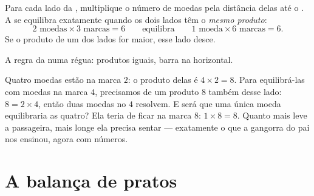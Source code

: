 \begin{proposition}\label{prop:g3:levers-and-scales:rule}
Para cada lado da , multiplique o número de moedas pela
distância delas até o . A  se equilibra
exatamente quando os dois lados têm o \emph{mesmo produto}:
\[
2 \text{ moedas} \times 3 \text{ marcas} = 6
\qquad\text{equilibra}\qquad
1 \text{ moeda} \times 6 \text{ marcas} = 6 .
\]
Se o produto de um dos lados for maior, esse lado desce.
\end{proposition}

\begin{omfigure}

{\small A regra da  numa régua: produtos iguais, barra na
horizontal.}
\end{omfigure}

\begin{example}\label{ex:g3:levers-and-scales:using}
Quatro moedas estão na marca $2$: o produto delas é $4 \times 2 = 8$.
Para equilibrá-las com moedas na marca $4$, precisamos de um produto
$8$ também desse lado: $8 = 2 \times 4$, então duas moedas no $4$
resolvem. E será que uma única moeda equilibraria as quatro? Ela
teria de ficar na marca $8$: $1 \times 8 = 8$. Quanto mais leve a
passageira, mais longe ela precisa sentar --- exatamente o que a
gangorra do pai nos ensinou, agora com números.
\end{example}

\section{A balança de pratos}

